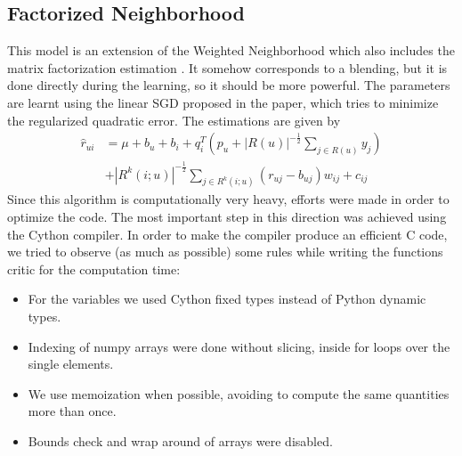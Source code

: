 \documentclass[10pt,conference,compsocconf]{IEEEtran}
\begin{document}
\subsection{Factorized Neighborhood}
This model is an extension of the Weighted Neighborhood which also includes the matrix factorization estimation \cite{koren2008factorization}. It somehow corresponds to a blending, but it is done directly during the learning, so it should be more powerful. The parameters are learnt using the linear SGD proposed in the paper, which tries to minimize the regularized quadratic error. The estimations are given by
\begin{align}
\hat{r}_{ui} &= \mu + b_{u} + b_{i} + q_{i}^{T}(p_{u} + |R(u)|^{-\frac{1}{2}} \sum_{j \in R(u)}y_{j}) \nonumber \\
&+ |R^{k}(i;u)|^{-\frac{1}{2}} \sum_{j \in R^{k}(i;u)} (r_{uj}-b_{uj})w_{ij} + c_{ij} 
\end{align}
Since this algorithm is computationally very heavy, efforts were made in order to optimize the code. The most important step in this direction was achieved using the Cython compiler.  In order to make the compiler produce an efficient C code, we tried to observe (as much as possible) some rules while writing the functions critic for the computation time:
\begin{itemize}
\item For the variables we used Cython fixed types instead of Python dynamic types.
\item Indexing of numpy arrays were done without slicing, inside for loops over the single elements.
\item We use memoization when possible, avoiding to compute the same quantities more than once.
\item Bounds check and wrap around of arrays were disabled.
\end{itemize}
\end{document}
